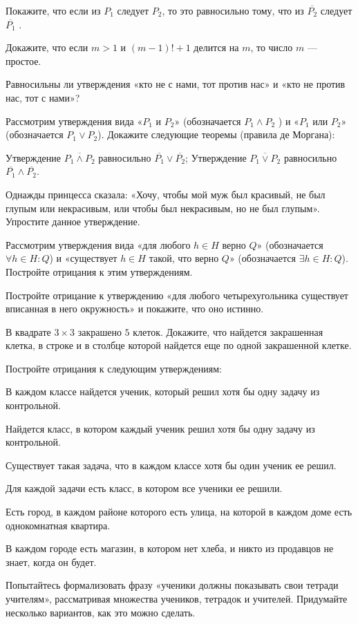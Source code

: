 \documentclass[a4paper,11pt]{article}
\begin{document}
 Покажите, что если из $P_1$ следует $P_2$, то это равносильно тому, что из $\overline{P_2}$ следует $\overline{P_1}$ .

 Докажите, что если $m >1$ и $(m-1)! + 1$ делится на $m$, то число $m$ --- простое.

 Равносильны ли утверждения «кто не с нами, тот против нас» и «кто не против нас, тот с нами»?

 Рассмотрим утверждения вида «$P_1$ и $P_2$» (обозначается $P_1 \wedge P_2$ ) и «$P_1$ или $P_2$» (обозначается $P_1 \vee P_2$).
Докажите следующие теоремы (правила де Моргана):

 Утверждение $\overline{P_1 \wedge P_2}$ равносильно $\overline{P_1} \vee\overline{P_2}$;
 Утверждение $\overline{P_1 \vee P_2}$ равносильно $\overline{P_1} \wedge \overline{P_2}$.

 Однажды принцесса сказала: «Хочу, чтобы мой муж был красивый, не был глупым или некрасивым, или чтобы был некрасивым, но не был глупым». Упростите данное утверждение.

 Рассмотрим утверждения вида «для любого $h\in H$ верно $Q$» (обозначается $\forall h\in H : Q$) и «существует $h\in H$ такой, что верно $Q$» (обозначается $\exists h\in H : Q$). Постройте отрицания к этим утверждениям.

 Постройте отрицание к утверждению «для любого четырехугольника существует вписанная в него окружность» и покажите, что оно истинно.

 В квадрате $3 \times 3$ закрашено $5$ клеток. Докажите, что найдется закрашенная клетка, в строке и в столбце которой найдется еще по одной закрашенной клетке.

 Постройте отрицания к следующим утверждениям:

 В каждом классе найдется ученик, который решил хотя бы одну задачу из контрольной.

 Найдется класс, в котором каждый ученик решил хотя бы одну задачу из контрольной.

 Существует такая задача, что в каждом классе хотя бы один ученик ее решил.

 Для каждой задачи есть класс, в котором все ученики ее решили.

 Есть город, в каждом районе которого есть улица, на которой в каждом доме есть однокомнатная квартира.

 В каждом городе есть магазин, в котором нет хлеба, и никто из продавцов не знает, когда он будет.


 Попытайтесь формализовать фразу «ученики должны показывать свои тетради учителям», рассматривая множества учеников, тетрадок и учителей. Придумайте несколько вариантов, как это можно сделать. 

\end{document}
